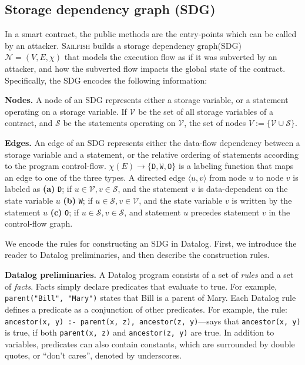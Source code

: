 \documentclass[conference, romanappendices]{tex/IEEEtran}
\theoremstyle{bfnote}
\newcommand{\toolname}{\textsc{Sailfish}\xspace}
\newcommand{\smart}{smart contract}
\newcommand{\sdg}{storage dependency graph\xspace}
\begin{document}
\subsection{\textbf{Storage dependency graph (SDG)}}
\label{sec:sdg}
In a \smart, the public methods 
are the entry-points which can be called by an attacker.
\toolname builds a \sdg (SDG) $\mathcal{N} = (V, E, \chi)$ that models the execution flow as if it was subverted by an attacker, and how the subverted flow impacts the global state of the contract.
Specifically, the SDG encodes the following information:

\vspace{1mm}
\noindent
\textbf{Nodes.}
A node of an SDG represents either a storage variable, or a statement operating on a storage variable.
If $\mathcal{V}$ be the set of all storage variables of a contract, and $\mathcal{S}$ be the statements operating on $\mathcal{V}$, the set of nodes $V := \{\mathcal{V} \cup \mathcal{S}\}$.

\vspace{1mm}
\noindent
\textbf{Edges.}
An edge of an SDG represents either the data-flow dependency between a storage variable and a statement, or the relative ordering of statements according to the program control-flow.
$\chi(E) \rightarrow \{\texttt{D}, \texttt{W}, \texttt{O}\}$ is a labeling function that maps an edge to one of the three types.
A directed edge $\langle u,v \rangle$ from node $u$ to node $v$ is labeled as
\textbf{(a)} \texttt{D}; if $u \in \mathcal{V}, v \in \mathcal{S}$, and the statement $v$ is data-dependent on the state variable $u$
\textbf{(b)} \texttt{W}; if $u \in \mathcal{S}, v \in \mathcal{V}$, and the state variable $v$ is written by the statement $u$
\textbf{(c)} \texttt{O}; if $u \in \mathcal{S}, v \in \mathcal{S}$, and statement $u$ precedes statement $v$ in the control-flow graph.



We encode the rules for constructing an SDG in Datalog.
First, we introduce the reader to Datalog preliminaries, and then describe the construction rules.

\noindent
\textbf{Datalog preliminaries.}
A Datalog program  consists of a set of \emph{rules} and a set of \emph{facts}. 
Facts simply declare predicates that evaluate to true. For example, 
{\tt parent("Bill", "Mary")} states that Bill is a parent of Mary. Each Datalog rule defines a predicate as a conjunction of other
predicates. For example, the rule: \texttt{ancestor(x, y) :- parent(x, z), ancestor(z, y)}---says that
\verb+ancestor(x, y)+ is true, if both \verb+parent(x, z)+ and
\verb+ancestor(z, y)+ are true. In addition to variables, predicates can 
also contain constants, 
which are surrounded by double quotes, or
``don't cares'',  denoted by underscores.
\end{document}

